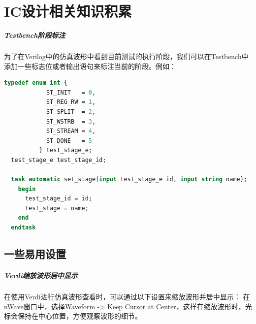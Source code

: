 \chapter{IC设计相关知识积累}

\paragraph{Testbench阶段标注}
为了在Verilog中的仿真波形中看到目前测试的执行阶段，我们可以在Testbench中添加一些标志位或者输出语句来标注当前的阶段。例如：
\begin{lstlisting}[language=SystemVerilog]
  typedef enum int {
            ST_INIT   = 0,
            ST_REG_RW = 1,
            ST_SPLIT  = 2,
            ST_WSTRB  = 3,
            ST_STREAM = 4,
            ST_DONE   = 5
          } test_stage_e;
  test_stage_e test_stage_id;

  task automatic set_stage(input test_stage_e id, input string name);
    begin
      test_stage_id = id;
      test_stage = name;
    end
  endtask
\end{lstlisting}

\section{一些易用设置}

\paragraph{Verdi缩放波形居中显示}
在使用Verdi进行仿真波形查看时，可以通过以下设置来缩放波形并居中显示：
在nWave窗口中，选择Waveform -> Keep Cursor at Center，这样在缩放波形时，光标会保持在中心位置，方便观察波形的细节。